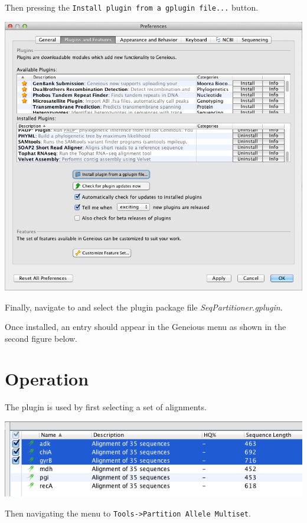 \documentclass[12pt,letterpaper]{article}
\begin{document}
\hfill

Then pressing the \texttt{Install plugin from a gplugin file...} button.

\hfill

\includegraphics[resolution=130]{plugins_dialog.png}

\hfill

Finally, navigate to and select the plugin package file
\textit{SeqPartitioner.gplugin}.

Once installed, an entry should appear in the Geneious menu as shown in the
second figure below.

\section{Operation}
The plugin is used by first selecting a set of alignments.

\hfill

\includegraphics[resolution=120]{alignment_selection.png}

\hfill

Then navigating the menu to \texttt{Tools->Partition Allele Multiset}.
\end{document}
